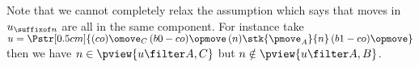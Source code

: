 Note that we cannot completely relax the assumption
which says that moves in $u_{\suffixof n}$ are all in the same component.
For instance take $u = \Pstr[0.5cm]{(co){\omove_C}\thinspace
(b0-co){\opmove} \thinspace
(n){\stk{\pmove_A}{n}} \thinspace
(b1-co){\opmove}}$ then we have $n\in\pview{u\filter A,C}$ but $n\notin\pview{u\filter A,B}$.


%
%


